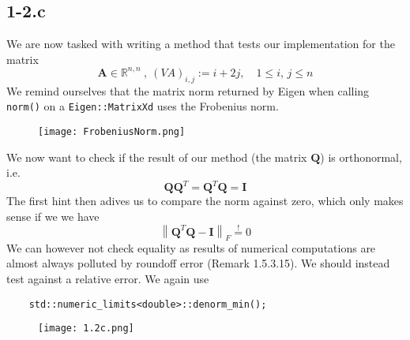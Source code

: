 \documentclass{article}
\begin{document}
\subsection*{1-2.c} We are now tasked with writing a method that tests our implementation for the matrix
\begin{equation*}
    \mathbf{A} \in \mathbb{R}^{n,n} \: , \: \left(VA\right)_{i,j} := i + 2j, \quad 1 \leq i, \, j \leq n
\end{equation*}
We remind ourselves that the matrix norm returned by Eigen when calling \verb|norm()| on a \verb|Eigen::MatrixXd| uses the Frobenius norm.
\begin{figure}[!hbt]
    \centering
\texttt{[image: FrobeniusNorm.png]}
\end{figure}
We now want to check if the result of our method (the matrix $\mathbf{Q}$) is orthonormal, i.e.
\begin{equation*}
    \mathbf{Q}\mathbf{Q}^{T} = \mathbf{Q}^{T}\mathbf{Q} = \mathbf{I}
\end{equation*}
The first hint then adives us to compare the norm against zero, which only makes sense if we we have
\begin{equation*}
    \left\lVert \mathbf{Q}^{T}\mathbf{Q} - \mathbf{I}\right\rVert_{F} \overset{!}{=} 0
\end{equation*}
We can however not check equality as results of numerical computations are almost always polluted by roundoff error (Remark 1.5.3.15). We should instead test against a relative error. We again use 
\begin{lstlisting}
    std::numeric_limits<double>::denorm_min();
\end{lstlisting}
\begin{figure}[!hbt]
    \centering
\texttt{[image: 1.2c.png]}
\end{figure}
\end{document}
